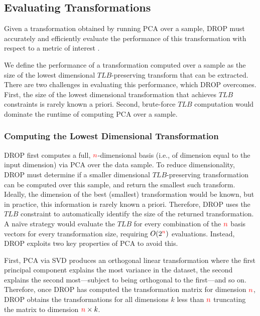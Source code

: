 \subsection{Evaluating Transformations}
\label{subsec:teval}
Given a transformation obtained by running PCA over a sample, DROP must accurately and efficiently evaluate the performance of this transformation with respect to a metric of interest . 

We define the performance of a transformation computed over a sample as the size of the lowest dimensional $TLB$-preserving transform that can be extracted.
There are two challenges in evaluating this performance, which DROP overcomes.
First, the size of the lowest dimensional transformation that achieves $TLB$ constraints is rarely known a priori. 
Second, brute-force $TLB$ computation would dominate the runtime of computing PCA over a sample.

\subsubsection{Computing the Lowest Dimensional Transformation}


DROP first computes a full, ${\color{red}n}$-dimensional basis (i.e., of dimension equal to the input dimension) via PCA over the data sample.
To reduce dimensionality, DROP must determine if a smaller dimensional $TLB$-preserving transformation can be computed over this sample, and return the smallest such transform. 
Ideally, the dimension of the best (smallest) transformation would be known, but in practice, this information is rarely known a priori.   
Therefore, DROP uses the $TLB$ constraint to automatically identify the size of the returned transformation.
A na\"ive strategy would evaluate the $TLB$ for every combination of the ${\color{red}n}$ basis vectors for every transformation size, requiring $O(2^{\color{red}n})$ evaluations. 
Instead, DROP exploits two key properties of PCA to avoid this.

First, PCA via SVD produces an orthogonal linear transformation where the first principal component explains the most variance in the dataset, the second explains the second most---subject to being orthogonal to the first---and so on.  
Therefore, once DROP has computed the transformation matrix for dimension ${\color{red}n}$, DROP obtains the transformations for all dimensions $k$ less than ${\color{red}n}$ truncating the matrix to dimension ${\color{red}n} \times k$.


